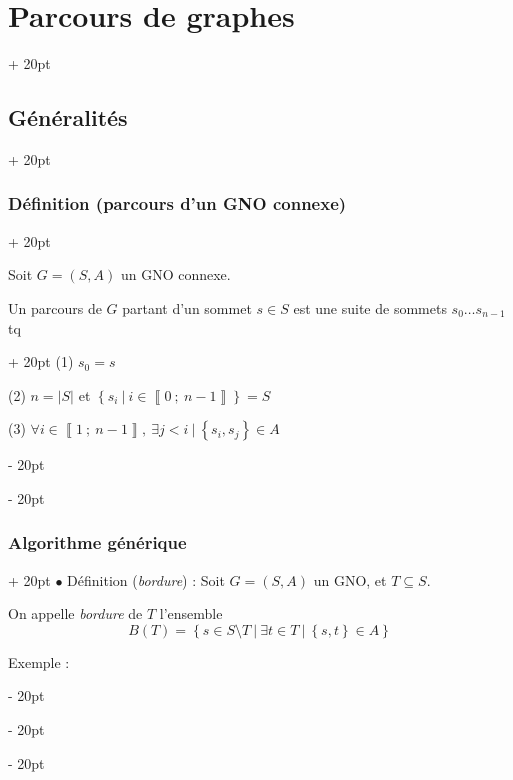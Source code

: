 \documentclass[a4paper, 12pt, twoside]{article}
\newcommand{\nset}[2]{\left\llbracket #1\ ;\ #2 \right\rrbracket}
\newcommand{\set}[1]{\left\{ #1 \right\}}
\newcommand{\abs}[1]{\left\lvert #1 \right\rvert}
\newcommand{\ind}[1][20pt]{\advance\leftskip + #1}
\newcommand{\deind}[1][20pt]{\advance\leftskip - #1}
\newenvironment{indt}[2][20pt]{#2 \par \ind[#1]}{\par \deind} %
\begin{document}
    \begin{indt}{\section{Parcours de graphes}}
        \begin{indt}{\subsection{Généralités}}
            \begin{indt}{\subsubsection{Définition (parcours d'un GNO connexe)}}
                \label{4.1.1}

                Soit $G = (S, A)$ un GNO connexe.

                \begin{indt}{Un parcours de $G$ partant d'un sommet $s \in S$ est une suite de sommets $s_0 \ldots s_{n - 1}$ tq}
                    (1) $s_0 = s$

                    (2) $n = \abs S$ et $\set{s_i\ |\ i \in \nset 0 {n - 1}} = S$

                    (3) $\forall i \in \nset{1}{n - 1},\ \exists j < i\ |\ \set{s_i, s_j} \in A$
                \end{indt}
            \end{indt}

            \vspace{12pt}
            
            \begin{indt}{\subsubsection{Algorithme générique}}
                $\bullet$ Définition (\textit{bordure}) : Soit $G = (S, A)$ un GNO, et $T \subseteq S$.

                On appelle \textit{bordure} de $T$ l'ensemble
                \[
                    B(T) = \set{s \in S \setminus T\ |\ \exists t \in T\ |\ \set{s, t} \in A}
                \]

                Exemple :

                \begin{center}
\end{center}
\end{indt}
\end{indt}
\end{indt}
\end{document}
